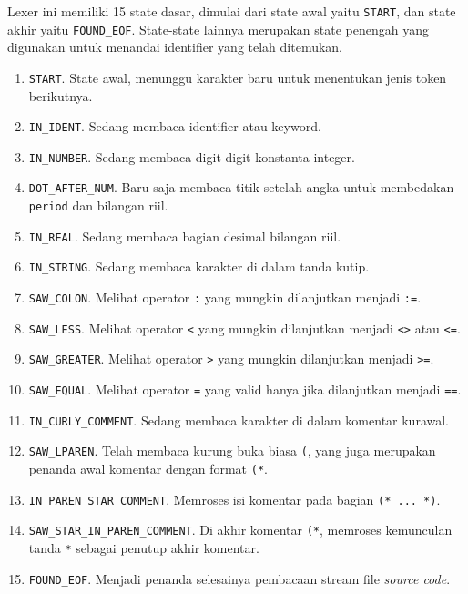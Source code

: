 Lexer ini memiliki 15 state dasar, dimulai dari state awal yaitu \texttt{START}, dan state akhir yaitu \texttt{FOUND\_EOF}. State-state lainnya merupakan state penengah yang digunakan untuk menandai identifier yang telah ditemukan.
\begin{enumerate}
    \item \texttt{START}. State awal, menunggu karakter baru untuk menentukan jenis token berikutnya.

    \item \texttt{IN\_IDENT}. Sedang membaca identifier atau keyword.

    \item \texttt{IN\_NUMBER}. Sedang membaca digit-digit konstanta integer.

    \item \texttt{DOT\_AFTER\_NUM}. Baru saja membaca titik setelah angka untuk membedakan \texttt{period} dan bilangan riil.

    \item \texttt{IN\_REAL}. Sedang membaca bagian desimal bilangan riil.

    \item \texttt{IN\_STRING}. Sedang membaca karakter di dalam tanda kutip.

    \item \texttt{SAW\_COLON}. Melihat operator \texttt{:} yang mungkin dilanjutkan menjadi \texttt{:=}.

    \item \texttt{SAW\_LESS}. Melihat operator \texttt{\textless} yang mungkin dilanjutkan menjadi \texttt{\textless\textgreater} atau \texttt{\textless=}.

    \item \texttt{SAW\_GREATER}. Melihat operator \texttt{\textgreater} yang mungkin dilanjutkan menjadi \texttt{\textgreater=}.

    \item \texttt{SAW\_EQUAL}. Melihat operator \texttt{=} yang valid hanya jika dilanjutkan menjadi \texttt{==}.

    \item \texttt{IN\_CURLY\_COMMENT}. Sedang membaca karakter di dalam komentar kurawal.

    \item \texttt{SAW\_LPAREN}. Telah membaca kurung buka biasa \texttt{(}, yang juga merupakan penanda awal komentar dengan format \texttt{(*}.

    \item \texttt{IN\_PAREN\_STAR\_COMMENT}. Memroses isi komentar pada bagian \texttt{(* ... *)}.

    \item \texttt{SAW\_STAR\_IN\_PAREN\_COMMENT}. Di akhir komentar \texttt{(*}, memroses kemunculan tanda \texttt{*} sebagai penutup akhir komentar.

    \item \texttt{FOUND\_EOF}. Menjadi penanda selesainya pembacaan stream file \textit{source code}.
\end{enumerate}

